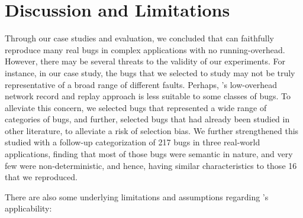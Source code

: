 
\section{Discussion and Limitations}
\label{sec:parikshanThreats}

Through our case studies and evaluation, we concluded that \parikshan can faithfully reproduce many real bugs in complex applications with no running-overhead.
However, there may be several threats to the validity of our experiments.
For instance, in our case study, the bugs that we selected to study may not be truly representative of a broad range of different faults.
Perhaps, \parikshan's low-overhead network record and replay approach is less suitable to some classes of bugs.
To alleviate this concern, we selected bugs that represented a wide range of categories of bugs, and further, selected bugs that had already been studied in other literature, to alleviate a risk of selection bias.
We further strengthened this studied with a follow-up categorization of 217 bugs in three real-world applications, finding that most of those bugs were semantic in nature, and very few were non-deterministic, and hence, having similar characteristics to those 16 that we reproduced. 

There are also some underlying limitations and assumptions regarding \parikshan's applicability:



